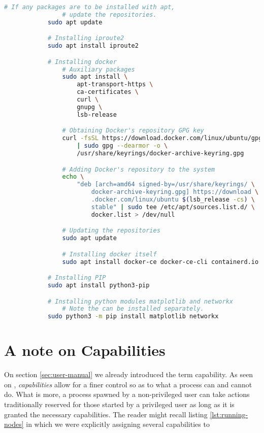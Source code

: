         \begin{lstlisting}[language = bash, caption = Commands for installing needed dependencies., label = lst:dependency-installation]
            # If any packages are to be installed with apt,
                # update the repositories.
            sudo apt update

            # Installing iproute2
            sudo apt install iproute2

            # Installing docker
                # Auxiliary packages
                sudo apt install \
                    apt-transport-https \
                    ca-certificates \
                    curl \
                    gnupg \
                    lsb-release

                # Obtaining Docker's repository GPG key
                curl -fsSL https://download.docker.com/linux/ubuntu/gpg \
                    | sudo gpg --dearmor -o \
                    /usr/share/keyrings/docker-archive-keyring.gpg

                # Adding Docker's repository to the system
                echo \
                    "deb [arch=amd64 signed-by=/usr/share/keyrings/ \
                        docker-archive-keyring.gpg] https://download \
                        .docker.com/linux/ubuntu $(lsb_release -cs) \
                        stable" | sudo tee /etc/apt/sources.list.d/ \
                        docker.list > /dev/null

                # Updating the repositories
                sudo apt update

                # Installing docker itself
                sudo apt install docker-ce docker-ce-cli containerd.io

            # Installing PIP
            sudo apt install python3-pip

            # Installing python modules matplotlib and networkx
                # Note the can be installed separately.
            sudo python3 -m pip install matplotlib networkx
        \end{lstlisting}

    \section{A note on Capabilities}
        On section \ref{sec:user-manual} we already introduced the term capability. As seen on \cite{bib:man-capabilities}, \textit{capabilities} allow for a finer control so as to what a process can and cannot do. What is more, a process spawned by a non-privileged user can take actions traditionally reserved for those started by a privileged user as long as it is granted the necessary capabilities. The reader might recall listing \ref{lst:running-nodes} in which we were explicitly assigning several capabilities to 

